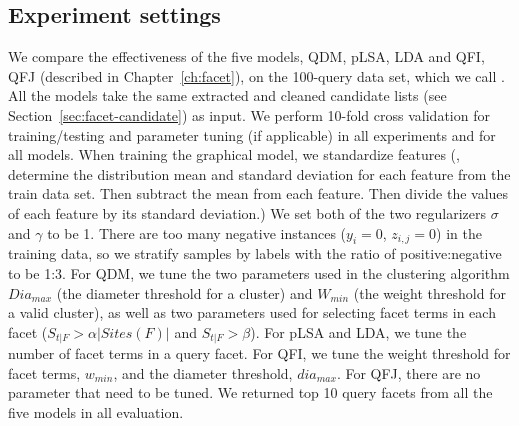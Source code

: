 \subsection{Experiment settings} \label{sec:intrinsic-settings}
We compare the effectiveness of the five models, QDM, pLSA, LDA and QFI, QFJ (described in Chapter~\ref{ch:facet}), on the 100-query data set, which we call \DQF. All the models take the same extracted and cleaned candidate lists (see Section~\ref{sec:facet-candidate}) as input.
We perform 10-fold cross validation for training/testing and parameter tuning (if applicable) in all experiments and for all models.
When training the graphical model, we standardize features (\ie, determine the distribution mean and standard deviation for each feature from the train data set. Then subtract the mean from each feature. Then divide the values of each feature by its standard deviation.) We set both of the two regularizers $\sigma$ and $\gamma$ to be 1.
There are too many negative instances ($y_i=0$, $z_{i,j}=0$) in the training data, so we stratify samples by labels with the ratio of positive:negative to be 1:3.
For QDM, we tune the two parameters used in the clustering algorithm $Dia_{max}$ (the diameter threshold for a cluster) and $W_{min}$ (the weight threshold for a valid cluster), as well as two parameters used for selecting facet terms in each facet ($S_{t|F} > \alpha |Sites(F)|$ and $S_{t|F}>\beta$).
For pLSA and LDA, we tune the number of facet terms in a query facet.
For QFI, we tune the weight threshold for facet terms, $w_{min}$, and the diameter threshold,  $dia_{max}$.
For QFJ, there are no parameter that need to be tuned.
We returned top 10 query facets from all the five models in all evaluation. 
